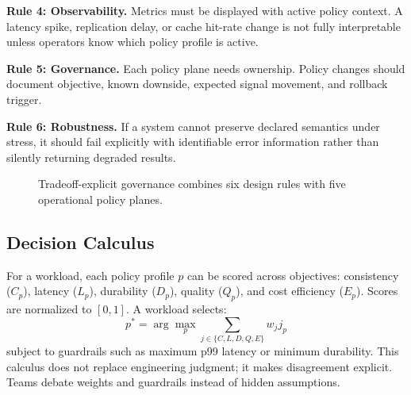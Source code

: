 \documentclass[conference]{IEEEtran}
\begin{document}
\textbf{Rule 4: Observability.} Metrics must be displayed with active policy context. A latency spike, replication delay, or cache hit-rate change is not fully interpretable unless operators know which policy profile is active.

\textbf{Rule 5: Governance.} Each policy plane needs ownership. Policy changes should document objective, known downside, expected signal movement, and rollback trigger.

\textbf{Rule 6: Robustness.} If a system cannot preserve declared semantics under stress, it should fail explicitly with identifiable error information rather than silently returning degraded results.

\begin{figure}[t]
\centering
{}
\caption{Tradeoff-explicit governance combines six design rules with five operational policy planes.}
\label{fig:framework}
\end{figure}

\subsection{Decision Calculus}

For a workload, each policy profile $p$ can be scored across objectives: consistency ($C_p$), latency ($L_p$), durability ($D_p$), quality ($Q_p$), and cost efficiency ($E_p$). Scores are normalized to $[0,1]$. A workload selects:
\begin{equation}
p^*=\arg\max_p \sum_{j\in\{C,L,D,Q,E\}} w_j j_p
\end{equation}
subject to guardrails such as maximum p99 latency or minimum durability. This calculus does not replace engineering judgment; it makes disagreement explicit. Teams debate weights and guardrails instead of hidden assumptions.
\end{document}

